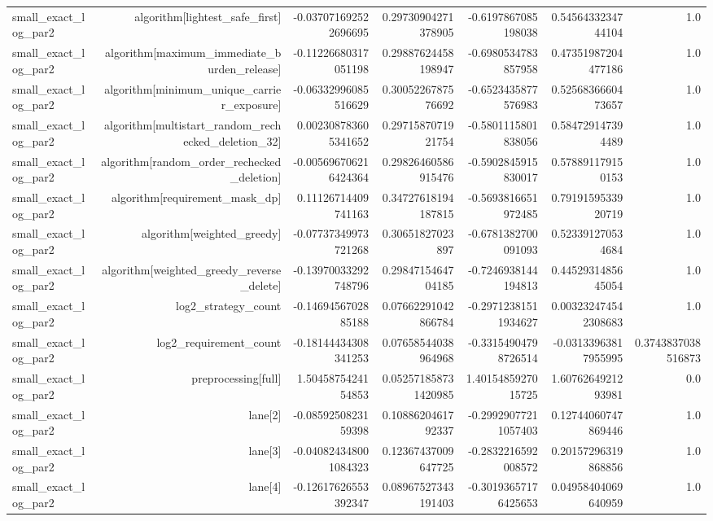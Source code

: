 {\begin{longtable}{lrrrrrr}
small\_exact\_log\_par2 & algorithm[lightest\_safe\_first] & -0.037071692522696695 & 0.29730904271378905 & -0.6197867085198038 & 0.5456433234744104 & 1.0 \\
small\_exact\_log\_par2 & algorithm[maximum\_immediate\_burden\_release] & -0.11226680317051198 & 0.29887624458198947 & -0.6980534783857958 & 0.47351987204477186 & 1.0 \\
small\_exact\_log\_par2 & algorithm[minimum\_unique\_carrier\_exposure] & -0.06332996085516629 & 0.3005226787576692 & -0.6523435877576983 & 0.5256836660473657 & 1.0 \\
small\_exact\_log\_par2 & algorithm[multistart\_random\_rechecked\_deletion\_32] & 0.002308783605341652 & 0.2971587071921754 & -0.5801115801838056 & 0.584729147394489 & 1.0 \\
small\_exact\_log\_par2 & algorithm[random\_order\_rechecked\_deletion] & -0.005696706216424364 & 0.29826460586915476 & -0.5902845915830017 & 0.578891179150153 & 1.0 \\
small\_exact\_log\_par2 & algorithm[requirement\_mask\_dp] & 0.11126714409741163 & 0.34727618194187815 & -0.5693816651972485 & 0.7919159533920719 & 1.0 \\
small\_exact\_log\_par2 & algorithm[weighted\_greedy] & -0.07737349973721268 & 0.30651827023897 & -0.6781382700091093 & 0.523391270534684 & 1.0 \\
small\_exact\_log\_par2 & algorithm[weighted\_greedy\_reverse\_delete] & -0.13970033292748796 & 0.2984715464704185 & -0.7246938144194813 & 0.4452931485645054 & 1.0 \\
small\_exact\_log\_par2 & log2\_strategy\_count & -0.1469456702885188 & 0.07662291042866784 & -0.29712381511934627 & 0.003232474542308683 & 1.0 \\
small\_exact\_log\_par2 & log2\_requirement\_count & -0.18144434308341253 & 0.07658544038964968 & -0.33154904798726514 & -0.03133963817955995 & 0.3743837038516873 \\
small\_exact\_log\_par2 & preprocessing[full] & 1.5045875424154853 & 0.052571858731420985 & 1.4015485927015725 & 1.6076264921293981 & 0.0 \\
small\_exact\_log\_par2 & lane[2] & -0.0859250823159398 & 0.1088620461792337 & -0.29929077211057403 & 0.12744060747869446 & 1.0 \\
small\_exact\_log\_par2 & lane[3] & -0.040824348001084323 & 0.12367437009647725 & -0.2832216592008572 & 0.20157296319868856 & 1.0 \\
small\_exact\_log\_par2 & lane[4] & -0.12617626553392347 & 0.08967527343191403 & -0.30193657176425653 & 0.04958404069640959 & 1.0 \\

\end{longtable}}
